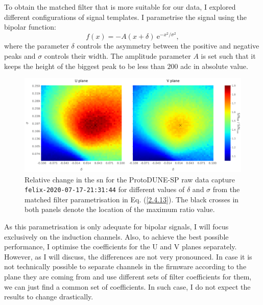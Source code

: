 To obtain the matched filter that is more suitable for our data, I explored different configurations of signal templates. I parametrise the signal using the bipolar function:
\begin{equation}\label{2.4.13}
	f(x) = -A (x + \delta) \ \mathrm{e}^{-x^{2}/\sigma^{2}},
\end{equation}
where the parameter $\delta$ controls the asymmetry between the positive and negative peaks and $\sigma$ controls their width. The amplitude parameter $A$ is set such that it keeps the height of the biggest peak to be less than $200$ \gls{adc} in absolute value.

\begin{figure}[t]
	\centering
	\includegraphics[width=1\linewidth]{Images/Matched_Filter/mf_fir_opt.png}
	\caption[Relative change in the \gls{sn} for the ProtoDUNE-SP raw data capture for different values of $\delta$ and $\sigma$ from the matched filter parametrisation.]{Relative change in the \gls{sn} for the ProtoDUNE-SP raw data capture \texttt{felix-2020-07-17-21:31:44} for different values of $\delta$ and $\sigma$ from the matched filter parametrisation in Eq. (\ref{2.4.13}). The black crosses in both panels denote the location of the maximum ratio value.}
	\label{fig:mf_opt}
\end{figure}

As this parametrisation is only adequate for bipolar signals, I will focus exclusively on the induction channels. Also, to achieve the best possible performance, I optimise the coefficients for the U and V planes separately. However, as I will discuss, the differences are not very pronounced. In case it is not technically possible to separate channels in the firmware according to the plane they are coming from and use different sets of filter coefficients for them, we can just find a common set of coefficients. In such case, I do not expect the results to change drastically.

